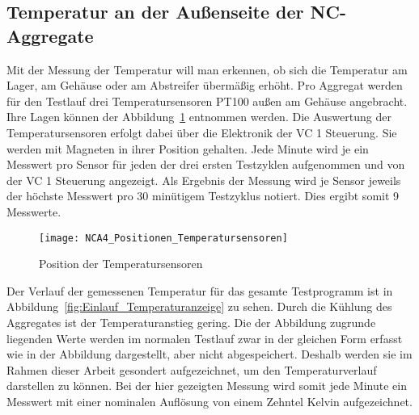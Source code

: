 \subsection{Temperatur an der Außenseite der NC-Aggregate} \label{cha:Temperatur_an_der_Aussenseite_des_NCA}








Mit der Messung der Temperatur will man erkennen, ob sich die Temperatur am Lager, am Gehäuse oder am Abstreifer übermäßig erhöht. Pro Aggregat werden für den Testlauf drei Temperatursensoren PT100 außen am Gehäuse angebracht. Ihre Lagen können der Abbildung~\ref{fig:Position_der_Temperatursensoren} entnommen werden. Die Auswertung der Temperatursensoren erfolgt dabei über die Elektronik der VC 1 Steuerung. Sie werden mit Magneten in ihrer Position gehalten. Jede Minute wird je ein Messwert pro Sensor für jeden der drei ersten Testzyklen aufgenommen und von der VC 1 Steuerung angezeigt. Als Ergebnis der Messung wird je Sensor jeweils der höchste Messwert pro 30 minütigem Testzyklus notiert. Dies ergibt somit 9 Messwerte.

\clearpage





\begin{figure}[H]
\centering
\texttt{[image: NCA4\_Positionen\_Temperatursensoren]} %
\caption{Position der Temperatursensoren} 
\label{fig:Position_der_Temperatursensoren}
\end{figure}

Der Verlauf der gemessenen Temperatur für das gesamte Testprogramm ist in Abbildung~\ref{fig:Einlauf_Temperaturanzeige} zu sehen.  Durch die Kühlung des Aggregates ist der Temperaturanstieg gering. Die der Abbildung zugrunde liegenden Werte werden im normalen Testlauf zwar in der gleichen Form erfasst wie in der Abbildung dargestellt, aber nicht abgespeichert. Deshalb werden sie im Rahmen dieser Arbeit gesondert aufgezeichnet, um den Temperaturverlauf darstellen zu können. Bei der hier gezeigten Messung wird somit jede Minute ein Messwert mit einer nominalen Auflösung von einem Zehntel Kelvin aufgezeichnet.

